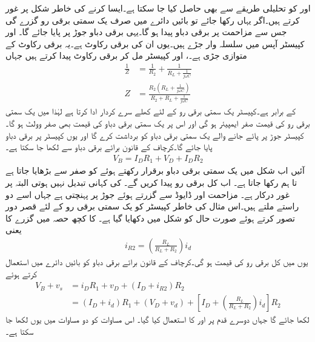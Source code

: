  اور  کو تحلیلی طریقے سے بھی حاصل کیا جا سکتا ہے۔ایسا کرنے کی خاطر شکل  پر غور کرتے ہیں۔اگر یہاں  رکھا جائے تو بائیں دائرے میں صرف یک سمتی برقی رو  گزرے گی جس سے مزاحمت  پر برقی دباو  پیدا ہو گا۔یہی برقی دباو جوڑ  پر پایا جائے گا۔ اور کپیسٹر  آپس میں سلسلہ وار جڑے ہیں۔یوں ان کی برقی رکاوٹ  ہے۔یہ برقی رکاوٹ  کے متوازی جڑی ہے۔، اور کپیسٹر مل کر برقی رکاوٹ  پیدا کرتے ہیں جہاں
\begin{align}
\frac{1}{Z}&=\frac{1}{R_2}+\frac{1}{R_L+\frac{1}{j \omega C}}\\
Z&=\frac{R_2 \left(R_L+\frac{1}{j \omega C} \right)}{R_2+R_L+\frac{1}{j \omega C}}
\end{align}
کے برابر ہے۔کپیسٹر یک سمتی برقی رو کے لئے کھلے سرے کردار ادا کرتا ہے لہٰذا  میں یک سمتی برقی رو کی قیمت صفر ایمپیئر ہو گی اور اس پر یک سمتی برقی دباو کی قیمت بھی صفر وولٹ ہو گا۔کپیسٹر  جوڑ  پر پائے جانے والے یک سمتی برقی دباو کو برداشت کرے گا اور یوں کپیسٹر پر  برقی دباو پایا جائے گا۔کرچاف کے قانون برائے برقی دباو سے لکھا جا سکتا ہے۔
\begin{align} \label{مساوات_ٹرانزسٹر_یکسمتی_منبع_بار_مساوات_جزو}
V_B=I_D R_1+V_D+I_D R_2
\end{align}
آئیں اب شکل  میں یک سمتی برقی دباو  برقرار رکھتے ہوئے  کو صفر سے بڑھایا جاتا ہے تا ہم  رکھا جاتا ہے۔ اب کل برقی رو  پیدا کریں گے۔ کی کہانی تبدیل نہیں ہوتی البتہ  پر غور درکار ہے۔ مزاحمت  اور ڈایوڈ سے گزرتے ہوئے جوڑ  پر پہنچتی ہے جہاں اسے دو راستے ملتے ہیں۔اس مثال کی خاطر کپیسٹر کو یک سمتی برقی رو کے لئے قصر دور تصور کرتے ہوئے صورت حال کو شکل میں دکھایا گیا ہے۔ کا کچھ حصہ  میں گزرے کا یعنی
\begin{align}
i_{R2}=\left(\frac{R_L}{R_L+R_2}\right) i_d
\end{align}
یوں  میں کل برقی رو کی قیمت  ہو گی۔کرچاف کے قانون برائے برقی دباو کو بائیں دائرے میں استعمال کرتے ہوئے
\begin{align*}
V_B+v_s&=i_D R_1+v_D+\left(I_D+i_{R2} \right)R_2\\
&=\left(I_D+i_d \right)R_1+ \left(V_D+v_d \right)+\left[I_D+\left(\frac{R_L}{R_L+R_2}\right) i_d \right]R_2
\end{align*}
لکھا جائے گا جہاں دوسرے قدم پر  اور  کا استعمال کیا گیا۔ اس مساوات کو دو مساوات میں یوں لکھا جا سکتا ہے۔
